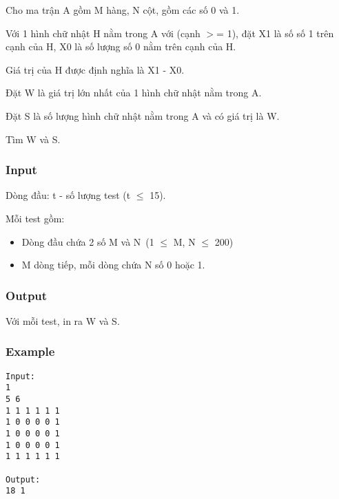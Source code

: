 

Cho ma trận A gồm M hàng, N cột, gồm các số 0 và 1.

Với 1 hình chữ nhật H nằm trong A với (cạnh $>$= 1), đặt X1 là số số 1 trên cạnh của H, X0 là số lượng số 0 nằm trên cạnh của H.

Giá trị của H được định nghĩa là X1 - X0.

Đặt W là giá trị lớn nhất của 1 hình chữ nhật nằm trong A.

Đặt S là số lượng hình chữ nhật nằm trong A và có giá trị là W.

Tìm W và S.

\subsubsection{Input}

Dòng đầu: t - số lượng test (t  $\le$  15).

Mỗi test gồm:
\begin{itemize}
	\item Dòng đầu chứa 2 số M và N (1  $\le$  M, N  $\le$  200)
	\item M dòng tiếp, mỗi dòng chứa N số 0 hoặc 1.
\end{itemize}

\subsubsection{Output}

Với mỗi test, in ra W và S.

\subsubsection{Example}
\begin{verbatim}
Input:
1
5 6
1 1 1 1 1 1
1 0 0 0 0 1
1 0 0 0 0 1
1 0 0 0 0 1
1 1 1 1 1 1

Output:
18 1
\end{verbatim}
